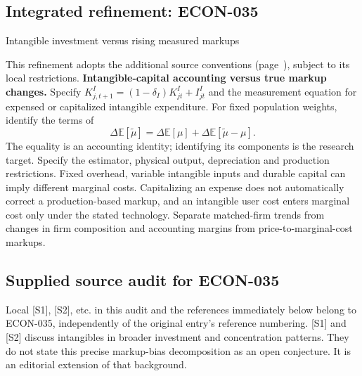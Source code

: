 \documentclass[11pt,a4paper]{article}
\begin{document}
\subsection*{Integrated refinement: ECON-035}
{\sffamily\small\color{muted}Intangible investment versus rising measured markups\par}
This refinement adopts the additional source conventions
(page~\pageref{audited:conventions}), subject to its local restrictions.
\textbf{Intangible-capital accounting versus true markup changes.}
Specify $K^I_{j,t+1}=(1-\delta_I)K^I_{jt}+I^I_{jt}$ and the measurement equation
for expensed or capitalized intangible expenditure. For fixed population weights,
identify the terms of
\[
\Delta\mathbb E[\widetilde\mu]
=\Delta\mathbb E[\mu]+\Delta\mathbb E[\widetilde\mu-\mu].
\]
The equality is an accounting identity; identifying its components is the
research target. Specify the estimator, physical output, depreciation and
production restrictions. Fixed overhead, variable intangible inputs and durable
capital can imply different marginal costs. Capitalizing an expense does not
automatically correct a production-based markup, and an intangible user cost
enters marginal cost only under the stated technology. Separate matched-firm
trends from changes in firm composition and accounting margins from
price-to-marginal-cost markups.
\subsection*{Supplied source audit for ECON-035}
Local [S1], [S2], etc. in this audit and the references immediately below
belong to ECON-035, independently of the original entry's reference numbering.
[S1] and [S2] discuss intangibles in broader investment and concentration patterns. They do not state this precise markup-bias decomposition as an open conjecture. It is an editorial extension of that background.
\end{document}
